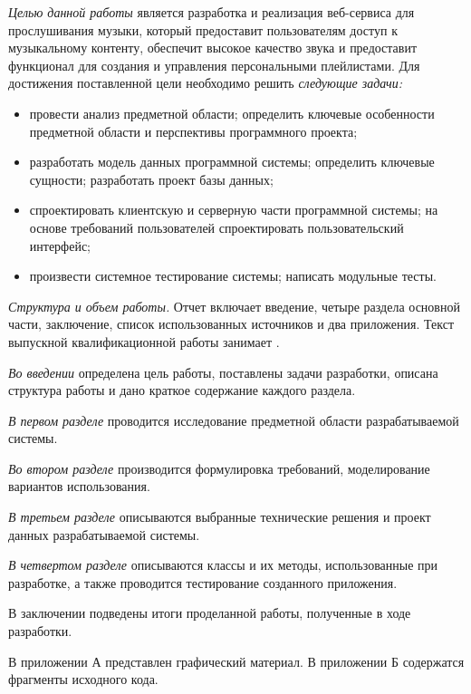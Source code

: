 \emph{Целью данной работы} является разработка и реализация веб-сервиса для прослушивания музыки, который предоставит пользователям доступ к музыкальному контенту, обеспечит высокое качество звука и предоставит функционал для создания и управления персональными плейлистами. Для достижения поставленной цели необходимо решить \emph{следующие задачи:}
\begin{itemize}
	\item провести анализ предметной области; определить ключевые особенности предметной области и перспективы программного проекта;
	\item разработать модель данных программной системы; определить ключевые сущности; разработать проект базы данных;
	\item спроектировать клиентскую и серверную части программной системы; на основе требований пользователей спроектировать пользовательский интерфейс;
	\item произвести системное тестирование системы; написать модульные тесты.
\end{itemize}

\emph{Структура и объем работы.} Отчет включает введение, четыре раздела основной части, заключение, список использованных источников и два приложения. Текст выпускной квалификационной работы занимает .

\emph{Во введении} определена цель работы, поставлены задачи разработки, описана структура работы и дано краткое содержание каждого раздела.

\emph{В первом разделе} проводится исследование предметной области разрабатываемой системы.

\emph{Во втором разделе} производится формулировка требований, моделирование вариантов использования.

\emph{В третьем разделе} описываются выбранные технические решения и проект данных разрабатываемой системы.

\emph{В четвертом разделе} описываются классы и их методы, использованные при разработке, а также проводится тестирование созданного приложения.

В заключении подведены итоги проделанной работы, полученные в ходе разработки.

В приложении А представлен графический материал.
В приложении Б содержатся фрагменты исходного кода.
